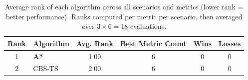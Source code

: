 \begin{table}[htbp]
\centering
\caption{Average rank of each algorithm across all scenarios and metrics (lower rank = better performance). Ranks computed per metric per scenario, then averaged over $3 \times 6 = 18$ evaluations.}
\label{tab:ranking}
\begin{tabular}{@{}clcccc@{}}
\toprule
\textbf{Rank} & \textbf{Algorithm} & \textbf{Avg. Rank} & \textbf{Best Metric Count} & \textbf{Wins} & \textbf{Losses} \\
\midrule
1 & \textbf{A*} & 1.00 & 6 & 0 & 0 \\
2 & CBS-TS & 2.00 & 6 & 0 & 0 \\
\bottomrule
\end{tabular}
\end{table}